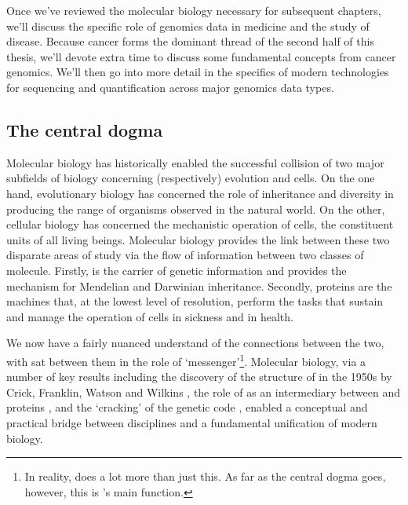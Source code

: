 \documentclass[thesis.tex]{subfiles}
\begin{document}
Once we've reviewed the molecular biology necessary for subsequent chapters, we'll discuss the specific role of genomics data in medicine and the study of disease. Because cancer forms the dominant thread of the second half of this thesis, we'll devote extra time to discuss some fundamental concepts from cancer genomics. We'll then go into more detail in the specifics of modern technologies for sequencing and quantification across major genomics data types.

\subsection{The central dogma \label{sec:central_dogma}}
Molecular biology has historically enabled the successful collision of two major subfields of biology concerning (respectively) evolution and cells. On the one hand, evolutionary biology has concerned the role of inheritance and diversity in producing the range of organisms observed in the natural world. On the other, cellular biology has concerned the mechanistic operation of cells, the constituent units of all living beings. Molecular biology provides the link between these two disparate areas of study via the flow of information between two classes of molecule. Firstly,  is the carrier of genetic information and provides the mechanism for Mendelian and Darwinian inheritance. Secondly, proteins are the machines that, at the lowest level of resolution, perform the tasks that sustain and manage the operation of cells in sickness and in health. 

We now have a fairly nuanced understand of the connections between the two, with  sat between them in the role of `messenger'\footnote{In reality,  does a lot more than just this. As far as the central dogma goes, however, this is 's main function.}. Molecular biology, via a number of key results including the discovery of the structure of  in the 1950s by Crick, Franklin, Watson and Wilkins \citep{franklin_molecular_1953, watson_molecular_1953, wilkins_molecular_1953, maddox_double_2003}, the role of  as an intermediary between  and proteins \citep{boivin_sur_1947, crick_protein_1958, brenner_unstable_1961, cobb_who_2015}, and the `cracking' of the genetic code \citep{crick_general_1961, nirenberg_rna_1964, brenner_uga_1967, tamura_genetic_2016}, enabled a conceptual and practical bridge
between disciplines and a fundamental unification of modern biology. 
\end{document}
